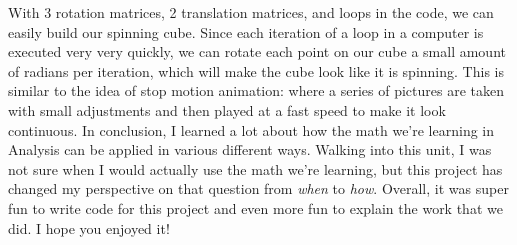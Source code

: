 \documentclass[14pt]{article}
\begin{document}
\vspace{-1mm}

\hspace{10mm}

With 3 rotation matrices, 2 translation matrices, and loops in the code, we can easily build our spinning cube. Since each iteration of a loop in a computer is executed very very quickly, we can rotate each point on our cube a small amount of radians per iteration, which will make the cube look like it is spinning. This is similar to the idea of stop motion animation: where a series of pictures are taken with small adjustments and then played at a fast speed to make it look continuous. In conclusion, I learned a lot about how the math we're learning in Analysis can be applied in various different ways. Walking into this unit, I was not sure when I would actually use the math we're learning, but this project has changed my perspective on that question from \textit{when} to \textit{how}. Overall, it was super fun to write code for this project and even more fun to explain the work that we did. I hope you enjoyed it!
\end{document}

